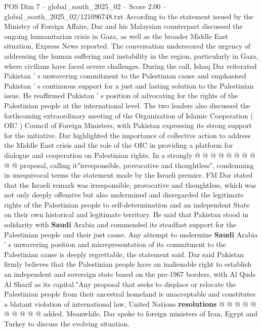 \begin{textsample}{POS Dim 7 – global\_south\_2025\_02 – Score 2.00 – global\_south\_2025\_02/121096748.txt}  \label{ex:f7_pos_187}
According to the statement issued by the Ministry of Foreign Affairs, Dar and his Malaysian counterpart discussed the ongoing humanitarian crisis in Gaza, as well as the broader Middle East situation, Express News reported.
The conversation underscored the urgency of addressing the human suffering and instability in the region, particularly in Gaza, where civilians have faced severe challenges.
During the call, Ishaq Dar reiterated Pakistan ' s unwavering commitment to the Palestinian cause and emphasised Pakistan ' s continuous support for a just and lasting solution to the Palestinian issue.
He reaffirmed Pakistan ' s position of advocating for the rights of the Palestinian people at the international level.
The two leaders also discussed the forthcoming extraordinary meeting of the Organization of Islamic Cooperation ( OIC ) Council of Foreign Ministers, with Pakistan expressing its strong support for the initiative.
Dar highlighted the importance of collective action to address the Middle East crisis and the role of the OIC in providing a platform for dialogue and cooperation on Palestinian rights.
In a strongly @ @ @ @ @ @ @ @ @ @ proposal, calling it"irresponsible, provocative and thoughtless", condemning in unequivocal terms the statement made by the Israeli premier.
FM Dar stated that the Israeli remark was irresponsible, provocative and thoughtless, which was not only deeply offensive but also undermined and disregarded the legitimate rights of the Palestinian people to self-determination and an independent State on their own historical and legitimate territory.
He said that Pakistan stood in solidarity with \textbf{Saudi} Arabia and commended its steadfast support for the Palestinian people and their just cause.
Any attempt to undermine \textbf{Saudi} Arabia ' s unwavering position and misrepresentation of its commitment to the Palestinian cause is deeply regrettable, the statement said.
Dar said Pakistan firmly believes that the Palestinian people have an inalienable right to establish an independent and sovereign state based on the pre-1967 borders, with Al Quds Al Sharif as its capital."Any proposal that seeks to displace or relocate the Palestinian people from their ancestral homeland is unacceptable and constitutes a blatant violation of international law, United Nations \textbf{resolutions} @ @ @ @ @ @ @ @ @ @ added.
Meanwhile, Dar spoke to foreign ministers of Iran, Egypt and Turkey to discuss the evolving situation.

\end{textsample}
